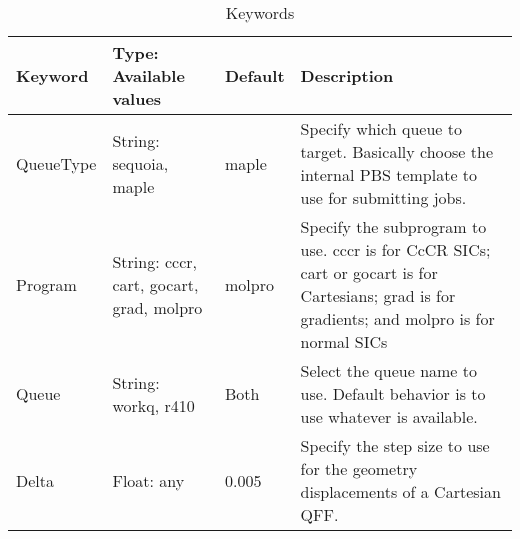 \documentclass{article}
\begin{document}
\begin{table}[ht]
  \centering
  \caption{Keywords}
  \label{tab:kwords}
  \begin{tabular}{|l|>{\raggedright}p{}|l|p{}|}
    \hline
    Keyword                       & Type: Available values &                Default &                 Description \\
    \hline                       
    QueueType                     & String: sequoia, maple &                  maple & Specify which queue to target.
                                                                                      Basically choose the internal
                                                                                      PBS template to use for      
                                                                                      submitting jobs. \\          
    \hline
    Program                       &  String: cccr, cart, gocart,
                                    grad, molpro                  &                 molpro & Specify the subprogram
                                                                                             to use. cccr is for          
                                                                                             CcCR                         
                                                                                             SICs; cart or gocart is for          
                                                                                             Cartesians; grad is for      
                                                                                             gradients; and molpro        
                                                                                             is for normal SICs \\        
    \hline
    Queue                         &    String: workq, r410 &                   Both &               Select the queue
                                                                                      name to use. Default behavior
                                                                                      is to use whatever is             
                                                                                      available.\\                 
    \hline
    Delta                         & Float: any & 0.005 & Specify the step size to use for the
                                                         geometry displacements of a Cartesian QFF. \\

\end{tabular}
\end{table}
\end{document}
